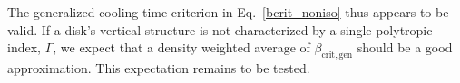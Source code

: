 The generalized cooling time criterion in Eq.\ \ref{bcrit_noniso}
thus appears to be valid.  If a disk's vertical structure is
not characterized by a single polytropic index, $\Gamma$, we 
expect that a density weighted average of  $\beta_\mathrm{crit,gen}$
should be a good approximation.  This expectation remains to be tested.






